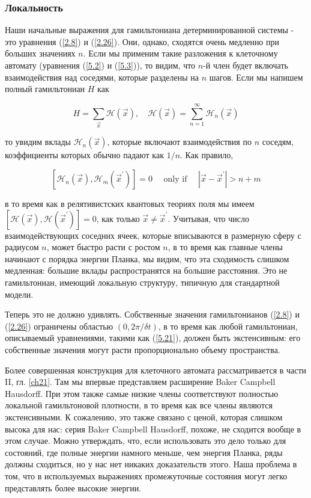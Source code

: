 \documentclass[main.tex]{subfiles}
\begin{document}
\subsubsection{Локальность}\label{ch5.6.1}

Наши начальные выражения для гамильтониана детерминированной системы - это уравнения (\ref{2.8}) и (\ref{2.26}). Они, однако, сходятся очень медленно при больших значениях $n$. Если мы применим такие разложения к клеточному автомату (уравнения (\ref{5.2}) и (\ref{5.3})), то видим, что $n$-й член будет включать взаимодействия над соседями, которые разделены на $n$ шагов. Если мы напишем полный гамильтониан $H$ как

\begin{equation}\label{5.21}
	H=\sum_{\vec{x}} \mathcal{H}(\vec{x}), \quad \mathcal{H}(\vec{x})=\sum_{n=1}^{\infty} \mathcal{H}_{n}(\vec{x})
\end{equation}
            
то увидим вклады $\mathcal{H}_n(\vec x)$, которые включают взаимодействия по $n$ соседям, коэффициенты которых обычно падают как $1 / n$. Как правило,

\begin{equation}\label{5.22}
	\left[\mathcal{H}_{n}(\vec{x}), \mathcal{H}_{m}\left(\vec{x}^{\prime}\right)\right]=0 \quad \text { only if } \quad\left|\vec{x}-\vec{x}^{\prime}\right|>n+m
\end{equation}

в то время как в релятивистских квантовых теориях поля мы имеем $\left[\mathcal{H}(\vec{x}), \mathcal{H}\left(\vec{x}^{\prime}\right)\right]=0$, как только $\vec{x} \neq \vec{x}^{\prime}$. Учитывая, что число взаимодействующих соседних ячеек, которые вписываются в размерную сферу с радиусом $n$, может быстро расти с ростом $n$, в то время как главные члены начинают с порядка энергии Планка, мы видим, что эта сходимость слишком медленная: большие вклады распространятся на большие расстояния. Это не гамильтониан, имеющий локальную структуру, типичную для стандартной модели.

Теперь это не должно удивлять. Собственные значения гамильтонианов (\ref{2.8}) и (\ref{2.26}) ограничены областью $(0,2\pi / \delta t)$, в то время как любой гамильтониан, описываемый уравнениями, такими как (\ref{5.21}), должен быть экстенсивным: его собственные значения могут расти пропорционально объему пространства.

Более совершенная конструкция для клеточного автомата рассматривается в части II, гл. \ref{ch21}. Там мы впервые представляем расширение Baker Campbell Hausdorff. При этом также самые низкие члены соответствуют полностью локальной гамильтоновой плотности, в то время как все члены являются экстенсивными. К сожалению, это также связано с ценой, которая слишком высока для нас: серия Baker Campbell Hausdorff, похоже, не сходится вообще в этом случае. Можно утверждать, что, если использовать это дело только для состояний, где полные энергии намного меньше, чем энергия Планка, ряды должны сходиться, но у нас нет никаких доказательств этого. Наша проблема в том, что в используемых выражениях промежуточные состояния могут легко представлять более высокие энергии.
\end{document}
